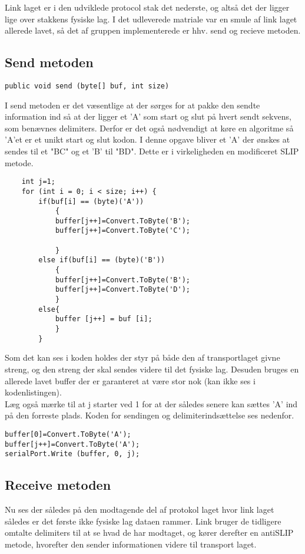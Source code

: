 Link laget er i den udviklede protocol stak det nederste, og altså det der ligger lige over stakkens fysiske lag. I det udleverede matriale var en smule af link laget allerede lavet, så det af gruppen implementerede er hhv. send og recieve metoden.

\subsection{Send metoden}

\begin{verbatim}
public void send (byte[] buf, int size)
\end{verbatim}

I send metoden er det væsentlige at der sørges for at pakke den sendte information ind så at der ligger et 'A' som start og slut på hvert sendt sekvens, som benævnes delimiters.  Derfor er det også nødvendigt at køre en algoritme så 'A'et er et unikt start og slut kodon. I denne opgave bliver et 'A' der ønskes at sendes til et "BC" og et 'B' til "BD". Dette er i virkeligheden en modificeret SLIP metode.


\begin{lstlisting}
	int j=1;
	for (int i = 0; i < size; i++) {
		if(buf[i] == (byte)('A'))
			{
			buffer[j++]=Convert.ToByte('B');
			buffer[j++]=Convert.ToByte('C');

			}
		else if(buf[i] == (byte)('B'))
			{
			buffer[j++]=Convert.ToByte('B');
			buffer[j++]=Convert.ToByte('D');
			}
		else{
			buffer [j++] = buf [i];
			}
		}
\end{lstlisting}

Som det kan ses i koden holdes der styr på både den af transportlaget givne streng, og den streng der skal sendes videre til det fysiske lag. Desuden bruges en allerede lavet buffer der er garanteret at være stor nok (kan ikke ses i kodenlistingen).\\

\noindent Læg også mærke til at j starter ved 1 for at der således senere kan sættes 'A' ind på den forreste plads. Koden for sendingen og delimiterindsættelse ses nedenfor.

\begin{verbatim}
buffer[0]=Convert.ToByte('A');
buffer[j++]=Convert.ToByte('A');
serialPort.Write (buffer, 0, j);
\end{verbatim}

\subsection{Receive metoden}
Nu ses der således på den modtagende del af protokol laget hvor link laget således er det første ikke fysiske lag dataen rammer. Link bruger de tidligere omtalte delimiters til at se hvad de har modtaget, og kører derefter en antiSLIP metode, hvorefter den sender informationen videre til transport laget. 